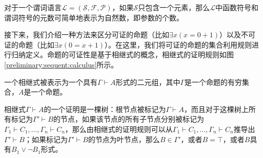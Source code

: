 	对于一个谓词语言$\mathcal{L}=(\mathcal{S}, \mathcal{F}, \mathcal{P})$，如果$\mathcal{S}$只包含一个元素，那么$\mathcal{L}$中函数符号和谓词符号的元数可简单地表示为自然数，即参数的个数。

接下来，我们介绍一种方法来区分可证的命题（比如$\exists x(x=0+1)$）以及不可证的命题（比如$\exists x(0=x+1)$）。在这里，我们将可证的命题的集合利用规则进行归纳定义。命题的可证性是基于相继式的概念，相继式的证明规则如图\ref{preliminary:sequent:calculus}所示。

\begin{definition}[相继式]
	一个相继式被表示为一个具有$\Gamma\vdash A$形式的二元组，其中$\Gamma$是一个命题的有穷集合，$A$是一个命题。
\end{definition}

\begin{definition}[相继式的证明]
	相继式$\Gamma\vdash A$的一个证明是一棵树：根节点被标记为$\Gamma\vdash A$，而且对于这棵树上所有标记为$\Gamma'\vdash B$的节点，如果该节点的所有子节点分别被标记为$\Gamma_1\vdash C_1,...,\Gamma_n\vdash C_n$，那么由相继式的证明规则可以从$\Gamma_1\vdash C_1,...,\Gamma_n\vdash C_n$推导出$\Gamma'\vdash B$；如果标记为$\Gamma'\vdash B$的节点为叶节点，那么$B\in \Gamma'$，或者$B=\top$，或者$B$具有$B_1\vee\neg B_1$形式。
\end{definition}

